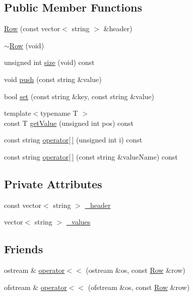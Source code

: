 \subsection*{Public Member Functions}
\begin{DoxyCompactItemize}
\item 
\hyperlink{class_row_afc5afcd4b8560ddd3b7372df2bc063a8}{Row} (const vector$<$ string $>$ \&header)
\item 
\hyperlink{class_row_a671be9f718722eccb2d3121f1579733e}{$\sim$\+Row} (void)
\item 
unsigned int \hyperlink{class_row_ac3dce6d0bd64e944a932a5a26c3ebcef}{size} (void) const
\item 
void \hyperlink{class_row_ac18926c6dc8fdfb37894009a8c80fdb1}{push} (const string \&value)
\item 
bool \hyperlink{class_row_a74ab22cc8f79c7a1c87da8fefae0d834}{set} (const string \&key, const string \&value)
\item 
{\footnotesize template$<$typename T $>$ }\\const T \hyperlink{class_row_a06931bff452df5a451da2268423bb6ea}{get\+Value} (unsigned int pos) const
\item 
const string \hyperlink{class_row_a705ecee70126716fbe16337e4a2b8764}{operator\mbox{[}$\,$\mbox{]}} (unsigned int i) const
\item 
const string \hyperlink{class_row_a42f23dd69d591da253b7428647f16ff8}{operator\mbox{[}$\,$\mbox{]}} (const string \&value\+Name) const
\end{DoxyCompactItemize}
\subsection*{Private Attributes}
\begin{DoxyCompactItemize}
\item 
const vector$<$ string $>$ \hyperlink{class_row_a98603a15923aa97e15198393ef3080c0}{\+\_\+header}
\item 
vector$<$ string $>$ \hyperlink{class_row_ab064db33f941055c8d99a6f47eae733c}{\+\_\+values}
\end{DoxyCompactItemize}
\subsection*{Friends}
\begin{DoxyCompactItemize}
\item 
ostream \& \hyperlink{class_row_a8962fdc6373687757234a811e803a1da}{operator$<$$<$} (ostream \&os, const \hyperlink{class_row}{Row} \&row)
\item 
ofstream \& \hyperlink{class_row_ad4e8b6c4b0238a50bde8e99ec8a0dcb0}{operator$<$$<$} (ofstream \&os, const \hyperlink{class_row}{Row} \&row)
\end{DoxyCompactItemize}


